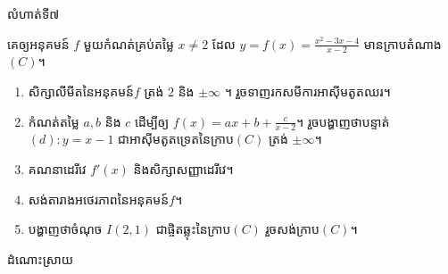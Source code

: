 \documentclass[expologarit]{subfiles}
\begin{document}
\begin{enumerate}[k]
\begin{center}
 \end{center}
\end{enumerate}
\newpage
\begin{center}
\color{violet} \kml លំហាត់ទី៧
\end{center}
គេឲ្យអនុគមន៍ $f$ មួយកំណត់គ្រប់តម្លៃ $x\neq 2$ ដែល $y=f(x)=\frac{x^2-3x-4}{x-2}$ មានក្រាបតំណាង $(C)$។
\begin{enumerate}[k]
\item សិក្សាលីមីតនៃអនុគមន៍$f$ ត្រង់ $2$ និង $\pm\infty$ ។ រួចទាញរកសមីការអាស៊ីមតូតឈរ។
\item កំណត់តម្លៃ $a,b$ និង $c$ ដើម្បីឲ្យ $f(x)=ax+b+\frac{c}{x-2}$។ រួចបង្ហាញថាបន្ទាត់ $(d): y=x-1$ ជាអាស៊ីមតូតទ្រេតនៃក្រាប$(C)$ ត្រង់ $\pm\infty$។
\item គណនាដេរីវេ $f'(x)$ និងសិក្សាសញ្ញាដេរីវេ។ 
\item សង់តារាងអថេរភាពនៃអនុគមន៍$f$។
\item បង្ហាញថាចំណុច $I(2,1)$ ជាផ្ចិតឆ្លុះនៃក្រាប$(C)$ រួចសង់ក្រាប$(C)$។
\end{enumerate}
\begin{center}
\color{violet} \kml ដំណោះស្រាយ
\end{center}
\end{document}

